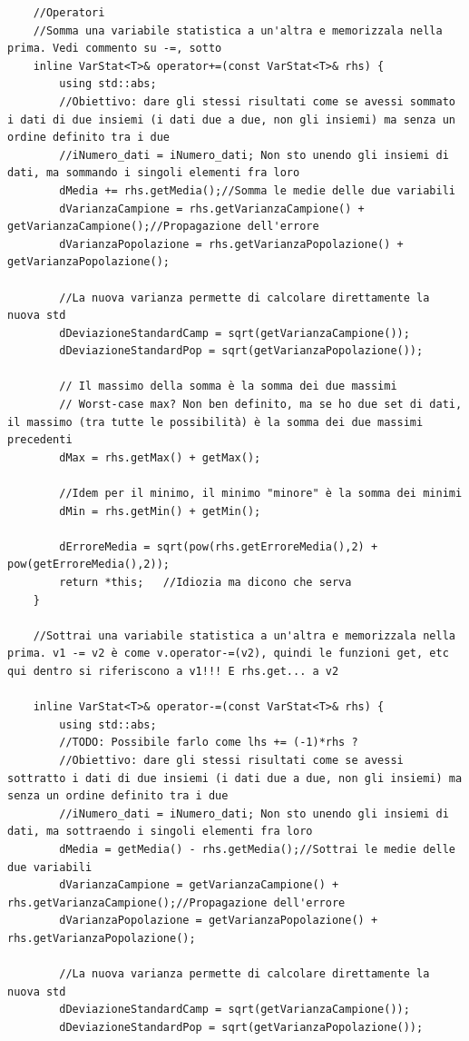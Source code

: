 \documentclass[12pt]{article} %
\begin{document}
\begin{verbatim}
	//Operatori
	//Somma una variabile statistica a un'altra e memorizzala nella prima. Vedi commento su -=, sotto
	inline VarStat<T>& operator+=(const VarStat<T>& rhs) {
		using std::abs;
		//Obiettivo: dare gli stessi risultati come se avessi sommato i dati di due insiemi (i dati due a due, non gli insiemi) ma senza un ordine definito tra i due
		//iNumero_dati = iNumero_dati; Non sto unendo gli insiemi di dati, ma sommando i singoli elementi fra loro
		dMedia += rhs.getMedia();//Somma le medie delle due variabili
		dVarianzaCampione = rhs.getVarianzaCampione() + getVarianzaCampione();//Propagazione dell'errore
		dVarianzaPopolazione = rhs.getVarianzaPopolazione() + getVarianzaPopolazione();

		//La nuova varianza permette di calcolare direttamente la nuova std
		dDeviazioneStandardCamp = sqrt(getVarianzaCampione());
		dDeviazioneStandardPop = sqrt(getVarianzaPopolazione());

		// Il massimo della somma è la somma dei due massimi
		// Worst-case max? Non ben definito, ma se ho due set di dati, il massimo (tra tutte le possibilità) è la somma dei due massimi precedenti
		dMax = rhs.getMax() + getMax();

		//Idem per il minimo, il minimo "minore" è la somma dei minimi
		dMin = rhs.getMin() + getMin();

		dErroreMedia = sqrt(pow(rhs.getErroreMedia(),2) + pow(getErroreMedia(),2));
		return *this;	//Idiozia ma dicono che serva
	}

	//Sottrai una variabile statistica a un'altra e memorizzala nella prima. v1 -= v2 è come v.operator-=(v2), quindi le funzioni get, etc qui dentro si riferiscono a v1!!! E rhs.get... a v2

	inline VarStat<T>& operator-=(const VarStat<T>& rhs) {
		using std::abs;
		//TODO: Possibile farlo come lhs += (-1)*rhs ?
		//Obiettivo: dare gli stessi risultati come se avessi sottratto i dati di due insiemi (i dati due a due, non gli insiemi) ma senza un ordine definito tra i due
		//iNumero_dati = iNumero_dati; Non sto unendo gli insiemi di dati, ma sottraendo i singoli elementi fra loro
		dMedia = getMedia() - rhs.getMedia();//Sottrai le medie delle due variabili
		dVarianzaCampione = getVarianzaCampione() + rhs.getVarianzaCampione();//Propagazione dell'errore
		dVarianzaPopolazione = getVarianzaPopolazione() + rhs.getVarianzaPopolazione();

		//La nuova varianza permette di calcolare direttamente la nuova std
		dDeviazioneStandardCamp = sqrt(getVarianzaCampione());
		dDeviazioneStandardPop = sqrt(getVarianzaPopolazione());


\end{verbatim}
\end{document}
